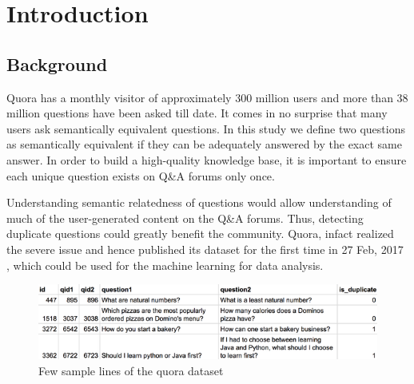 
\KECloa %


\newpage
{} %

\chapter{Introduction}
\section{Background}\label{sec:bkgrnd}%
Quora has a monthly visitor of approximately 300 million users and more than 38 million questions have been asked till date\cite{Quora2018}. It comes in no surprise that many users ask semantically equivalent questions. In this study we define two questions as semantically equivalent if they can be adequately answered by the exact same answer. In order to build a high-quality knowledge base, it is important to ensure each unique question exists on Q\&A forums only once. 
\par
Understanding semantic relatedness of questions would allow understanding of much of the user-generated content on the Q\&A forums. Thus, detecting duplicate questions could greatly benefit the community. Quora, infact realized the severe issue and hence published its dataset for the first time in 27 Feb, 2017 \cite{QuoraEngineering}, which could be used for the machine learning for data analysis. 

\begin{figure}[tbh] %
\begin{center}
	\includegraphics[width = 5in]{images/questions.png}
	\caption{Few sample lines of the quora dataset} %
	\label{questions} %
\end{center}
\end{figure}

